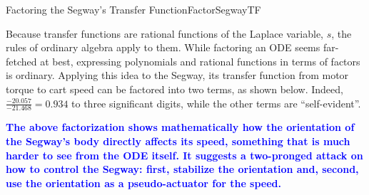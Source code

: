 \begin{factColor}{Factoring the Segway's Transfer Function}{FactorSegwayTF}

Because transfer functions are rational functions of the Laplace variable, $s$, the rules of ordinary algebra apply to them. While factoring an ODE seems far-fetched at best, expressing polynomials and rational functions in terms of factors is ordinary. Applying this idea to the Segway, its transfer function from motor torque to cart speed can be factored into two terms, as shown below. Indeed,  $\frac{-20.057}{-21.468} = 0.934$ to three significant digits, while the other terms are ``self-evident''. 

\begin{center}
    


\vspace*{1cm} 


\end{center}

\vspace*{1cm}
\textcolor{blue}{\bf \large The above factorization shows mathematically how the orientation of the Segway's body directly affects its speed, something that is much harder to see from the ODE itself. It suggests a two-pronged attack on how to control the Segway: first, stabilize the orientation and, second, use the orientation as a pseudo-actuator for the speed.}

\bigskip

\end{factColor}





